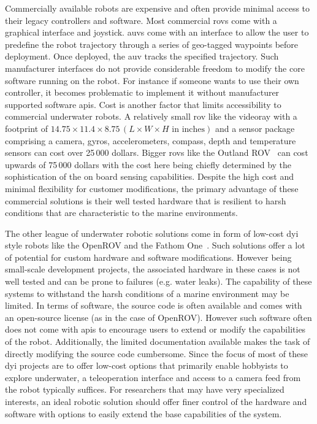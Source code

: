 Commercially available robots are expensive and often provide minimal access to their legacy controllers and software. Most commercial \gls{rov}s come with a graphical interface and joystick. \gls{auv}s come with an interface to allow the user to predefine the robot trajectory through a series of geo-tagged waypoints before deployment. Once deployed, the \gls{auv} tracks the specified trajectory. Such manufacturer interfaces do not provide considerable freedom to modify the core software running on the robot. For instance if someone wants to use their own controller, it becomes problematic to implement it without manufacturer supported software \gls{api}s. Cost is another factor that limits accessibility to commercial underwater robots. A relatively small \gls{rov} like the videoray \cite{videoray} with a footprint of $14.75\times 11.4\times 8.75 \,(L\times W\times H \text{ in inches})$ and a sensor package comprising a camera, gyros, accelerometers, compass, depth and temperature sensors can cost 
over 25\,000 dollars. Bigger \gls{rov}s like the Outland ROV~\cite{outlandrov} can cost upwards of 75\,000 dollars with the cost here being chiefly determined by the sophistication of the on board sensing capabilities. Despite the high cost and minimal flexibility for customer modifications, the primary advantage of these commercial solutions is their well tested hardware that is resilient to harsh conditions that are characteristic to the marine environments.

The other league of underwater robotic solutions come in form of low-cost \gls{dyi} style robots like the OpenROV \cite{openrov} and the Fathom One~\cite{fathomrov}. Such solutions offer a lot of potential for custom hardware and software modifications. However being small-scale development projects, the associated hardware in these cases is not well tested and can be prone to failures (e.g. water leaks). The capability of these systems to withstand the harsh conditions of a marine environment may be limited. In terms of software, the source code is often available and comes with an open-source license (as in the case of OpenROV). However such software often does not come with \gls{api}s to encourage users to extend or modify the capabilities of the robot. Additionally, the limited documentation available makes the task of directly modifying the source code cumbersome. Since the focus of most of these \gls{dyi} projects are to offer low-cost options that primarily enable hobbyists to explore underwater, a 
teleoperation 
interface and access to a camera feed from the robot typically suffices. For researchers that may have very specialized interests, an ideal robotic solution should offer finer control of the hardware and software with options to easily extend the base capabilities of the system.

